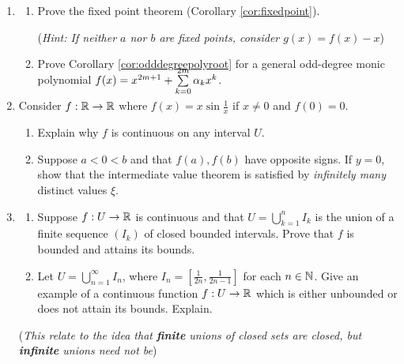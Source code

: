 \begin{exercises}{}{}
\begin{enumerate}
	  
	 	\item\begin{enumerate}
	 	  \item Prove the fixed point theorem (Corollary \ref{cor:fixedpoint}).\par
	 	  (\emph{Hint: If neither $a$ nor $b$ are fixed points, consider $g(x)=f(x)-x$}) 
	 	  
	 	  \item Prove Corollary \ref{cor:odddegreepolyroot} for a general odd-degree monic polynomial $f(x)=x^{2m+1}+\smash{\sum\limits_{k=0}^{2m}\alpha_kx^k}$. 
	 	\end{enumerate}
	 	

		\item Consider $f:\mathbb{R}\to\mathbb{R}$ where $f(x)=x\sin\frac 1x$ if $x\neq 0$ and $f(0)=0$.
		\begin{enumerate}
		  \item Explain why $f$ is continuous on any interval $U$.
		  \item Suppose $a<0<b$ and that $f(a),f(b)$ have opposite signs. If $y=0$, show that the intermediate value theorem is satisfied by \emph{infinitely many} distinct values $\xi$.
		\end{enumerate}
		
		
		\item\begin{enumerate}
		  \item Suppose $f:U\to\mathbb{R}$ is continuous and that $U=\bigcup\limits_{k=1}^nI_k$ is the union of a finite sequence $(I_k)$ of closed bounded intervals. Prove that $f$ is bounded and attains its bounds.
		  
		  \item Let $U=\bigcup\limits_{n=1}^\infty I_n$, where $I_n=[\frac 1{2n},\frac 1{2n-1}]$ for each $n\in\mathbb{N}$. Give an example of a continuous function $f:U\to\mathbb{R}$ which is either unbounded or does not attain its bounds. Explain.
		\end{enumerate}
		(\emph{This relate to the idea that \textbf{finite} unions of closed sets are closed, but \textbf{infinite} unions need not be})
	\end{enumerate}
\end{exercises}



\clearpage

\iffalse



